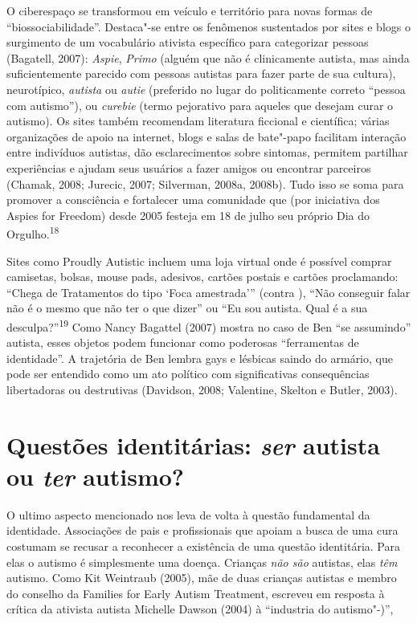 O ciberespaço se transformou em veículo e território para novas formas
de ``biossociabilidade''. Destaca"-se entre os fenômenos sustentados por
sites e blogs o surgimento de um vocabulário ativista específico para
categorizar pessoas (Bagatell, 2007): \emph{Aspie}, \emph{Primo} (alguém
que não é clinicamente autista, mas ainda suficientemente parecido com
pessoas autistas para fazer parte de sua cultura), neurotípico,
\emph{autista} ou \emph{autie} (preferido no lugar do politicamente
correto ``pessoa com autismo''), ou \emph{curebie} (termo pejorativo
para aqueles que desejam curar o autismo). Os sites também recomendam
literatura ficcional e científica; várias organizações de apoio na
internet, blogs e salas de bate"-papo facilitam interação entre
indivíduos autistas, dão esclarecimentos sobre sintomas, permitem
partilhar experiências e ajudam seus usuários a fazer amigos ou
encontrar parceiros (Chamak, 2008; Jurecic, 2007; Silverman, 2008a,
2008b). Tudo isso se soma para promover a consciência e fortalecer uma
comunidade que (por iniciativa dos Aspies for Freedom) desde 2005
festeja em 18 de julho seu próprio Dia do Orgulho.\textsuperscript{18}

Sites como Proudly Autistic incluem uma loja virtual onde é possível
comprar camisetas, bolsas, mouse pads, adesivos, cartões postais e
cartões proclamando: ``Chega de Tratamentos do tipo `Foca amestrada'''
(contra ), ``Não conseguir falar não é o mesmo que não ter o que
dizer'' ou ``Eu sou autista. Qual é a sua
desculpa?''\textsuperscript{19} Como Nancy Bagattel (2007) mostra no
caso de Ben ``se assumindo'' autista, esses objetos podem funcionar como
poderosas ``ferramentas de identidade''. A trajetória de Ben lembra gays
e lésbicas saindo do armário, que pode ser entendido como um ato
político com significativas consequências libertadoras ou destrutivas
(Davidson, 2008; Valentine, Skelton e Butler, 2003).

\chapter{Questões identitárias: \emph{ser} autista ou \emph{ter} autismo?}

O ultimo aspecto mencionado nos leva de volta à questão fundamental da
identidade. Associações de pais e profissionais que apoiam a busca de
uma cura costumam se recusar a reconhecer a existência de uma questão
identitária. Para elas o autismo é simplesmente uma doença. Crianças
\emph{não são} autistas, elas \emph{têm} autismo. Como Kit Weintraub
(2005), mãe de duas crianças autistas e membro do conselho da Families
for Early Autism Treatment, escreveu em resposta à crítica da ativista
autista Michelle Dawson (2004) à ``industria do autismo"-)'',

